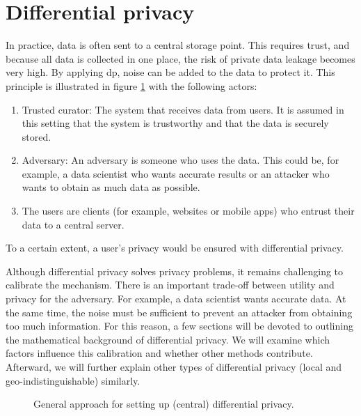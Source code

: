 % 
\section{Differential privacy} \label{section:dp}
In practice, data is often sent to a central storage point.
This requires trust, and because all data is collected in one place, the risk of private data leakage becomes very high.
By applying \gls{dp}, noise can be added to the data to protect it.
This principle is illustrated in figure \ref{fig:central-dp} with the following actors:
\begin{enumerate}
  \item Trusted curator: The system that receives data from users. It is assumed in this setting that the system is trustworthy and that the data is securely stored.
  \item Adversary: An adversary is someone who uses the data. This could be, for example, a data scientist who wants accurate results or an attacker who wants to obtain as much data as possible.
  \item The users are clients (for example, websites or mobile apps) who entrust their data to a central server.
\end{enumerate}
To a certain extent, a user's privacy would be ensured with differential privacy. \newline

Although differential privacy solves privacy problems, it remains challenging to calibrate the mechanism.
There is an important trade-off between utility and privacy for the adversary.
For example, a data scientist wants accurate data. At the same time, the noise must be sufficient to prevent an attacker from obtaining too much information.
For this reason, a few sections will be devoted to outlining the mathematical background of differential privacy.
We will examine which factors influence this calibration and whether other methods contribute.
Afterward, we will further explain other types of differential privacy (local and geo-indistinguishable) similarly.
\begin{figure}[h!]
  
  \caption{General approach for setting up (central) differential privacy.}
  \label{fig:central-dp}
\end{figure}

